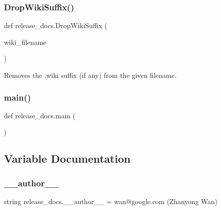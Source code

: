 \subsubsection{\texorpdfstring{DropWikiSuffix()}{DropWikiSuffix()}}
{\footnotesize\ttfamily def release\+\_\+docs.\+Drop\+Wiki\+Suffix (\begin{DoxyParamCaption}\item[{}]{wiki\+\_\+filename }\end{DoxyParamCaption})}

\begin{DoxyVerb}Removes the .wiki suffix (if any) from the given filename.\end{DoxyVerb}
 \mbox{\label{namespacerelease__docs_ac4eb92814ebe701e3936d1bfdd2ecf73}} 
\subsubsection{\texorpdfstring{main()}{main()}}
{\footnotesize\ttfamily def release\+\_\+docs.\+main (\begin{DoxyParamCaption}{ }\end{DoxyParamCaption})}



\subsection{Variable Documentation}
\mbox{\label{namespacerelease__docs_a552c656ae88e89e818b44f18fa40967b}} 
\subsubsection{\texorpdfstring{\_\_author\_\_}{\_\_author\_\_}}
{\footnotesize\ttfamily string release\+\_\+docs.\+\_\+\+\_\+author\+\_\+\+\_\+ = \textquotesingle{}wan@google.\+com (Zhanyong Wan)\textquotesingle{}\hspace{0.3cm}{\ttfamily [private]}}

\mbox{\label{namespacerelease__docs_a675f92ba4643a6aef7773a6178e49b29}} 
